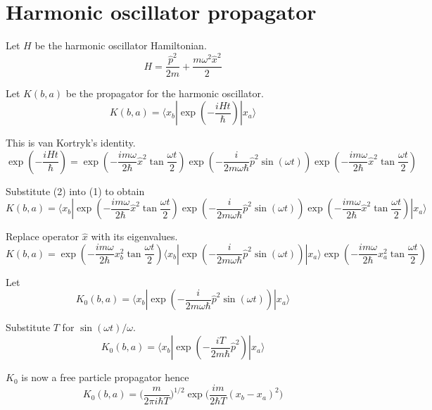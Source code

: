 \documentclass[12pt]{article}
\begin{document}
\section*{Harmonic oscillator propagator}
Let $H$ be the harmonic oscillator Hamiltonian.
\begin{equation*}
H=\frac{\hat p^2}{2m}+\frac{m\omega^2\hat x^2}{2}
\end{equation*}

Let $K(b,a)$ be the propagator for the harmonic oscillator.
\begin{equation*}
K(b,a)=\langle x_b|\exp\left(-\frac{iHt}{\hbar}\right)
|x_a\rangle
\tag{1}
\end{equation*}

This is van Kortryk's identity.
\begin{equation*}
\exp\left(-\frac{iHt}{\hbar}\right)=
\exp\left(-\frac{im\omega}{2\hbar}\hat x^2\tan\frac{\omega t}{2}\right)
\exp\left(-\frac{i}{2m\omega\hbar}\hat p^2\sin(\omega t)\right)
\exp\left(-\frac{im\omega}{2\hbar}\hat x^2\tan\frac{\omega t}{2}\right)
\tag{2}
\end{equation*}

Substitute (2) into (1) to obtain
\begin{equation*}
K(b,a)=\langle x_b|\exp\left(-\frac{im\omega}{2\hbar}\hat x^2\tan\frac{\omega t}{2}\right)
\exp\left(-\frac{i}{2m\omega\hbar}\hat p^2\sin(\omega t)\right)
\exp\left(-\frac{im\omega}{2\hbar}\hat x^2\tan\frac{\omega t}{2}\right)
|x_a\rangle
\end{equation*}

Replace operator $\hat x$ with its eigenvalues.
\begin{equation*}
K(b,a)=
\exp\left(-\frac{im\omega}{2\hbar}x_b^2\tan\frac{\omega t}{2}\right)
\langle x_b|\exp\left(-\frac{i}{2m\omega\hbar}\hat p^2\sin(\omega t)\right)|x_a\rangle
\exp\left(-\frac{im\omega}{2\hbar}x_a^2\tan\frac{\omega t}{2}\right)
\tag{3}
\end{equation*}

Let
$$
K_0(b,a)=\langle x_b|\exp\left(-\frac{i}{2m\omega\hbar}\hat p^2\sin(\omega t)\right)|x_a\rangle
$$

Substitute $T$ for $\sin(\omega t)/\omega$.
\begin{equation*}
K_0(b,a)=
\langle x_b|\exp\left(-\frac{iT}{2m\hbar}\hat p^2\right)|x_a\rangle
\end{equation*}

$K_0$ is now a free particle propagator hence
\begin{equation*}
K_0(b,a)=\biggl(\frac{m}{2\pi i\hbar T}\biggr)^{1/2}
\exp\biggl(\frac{im}{2\hbar T}(x_b-x_a)^2\biggr)
\end{equation*}
\end{document}
